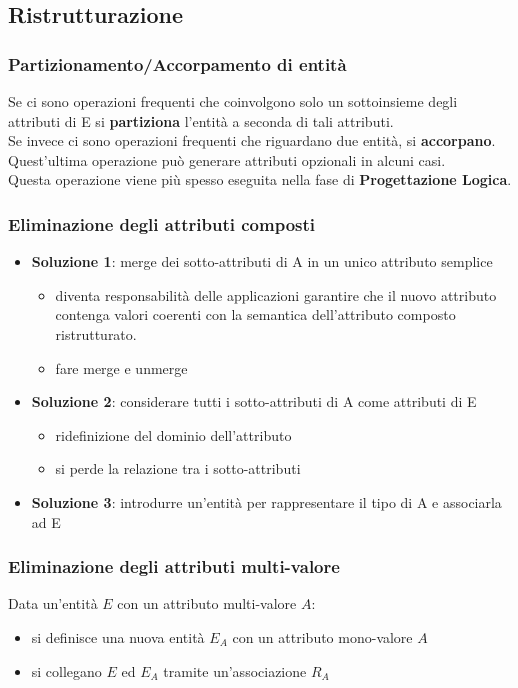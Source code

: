 \subsection{Ristrutturazione}
\subsubsection{Partizionamento/Accorpamento di entità}
Se ci sono operazioni frequenti che coinvolgono solo un sottoinsieme degli attributi di E si \textbf{partiziona} l'entità a seconda di tali attributi.\\
Se invece ci sono operazioni frequenti che riguardano due entità, si \textbf{accorpano}. Quest'ultima operazione può generare attributi opzionali in alcuni casi.\\
Questa operazione viene più spesso eseguita nella fase di \textbf{Progettazione Logica}.

\subsubsection{Eliminazione degli attributi composti}
\begin{itemize}
    \item \textbf{Soluzione 1}: merge dei sotto-attributi di A in un unico attributo semplice
    \begin{itemize}
        \item diventa responsabilità delle applicazioni garantire che il nuovo attributo contenga valori coerenti con la semantica dell'attributo composto ristrutturato.
        \item fare merge e unmerge
    \end{itemize}
    \item \textbf{Soluzione 2}: considerare tutti i sotto-attributi di A come attributi di E
    \begin{itemize}
        \item ridefinizione del dominio dell'attributo
        \item si perde la relazione tra i sotto-attributi
    \end{itemize}
    \item \textbf{Soluzione 3}: introdurre un’entità per rappresentare il tipo di A e associarla ad E
\end{itemize}

\subsubsection{Eliminazione degli attributi multi-valore}
Data un’entità $E$ con un attributo multi-valore $A$:
\begin{itemize}
    \item si definisce una nuova entità $E_A$ con un attributo mono-valore $A$
    \item si collegano $E$ ed $E_A$ tramite un'associazione $R_A$
\end{itemize}


